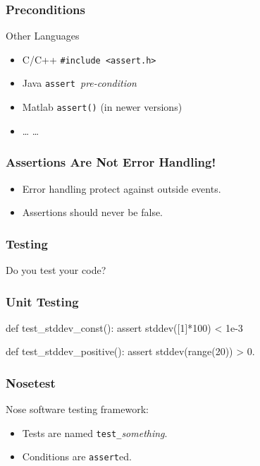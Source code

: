 \begin{frame}[fragile]
\frametitle{Preconditions}
\begin{block}{Other Languages}
\begin{itemize}
\item \alert{C/C++} \lstinline{#include <assert.h>}
\item \alert{Java} \lstinline{assert }\textit{pre-condition}
\item \alert{Matlab} \lstinline{assert()} (in newer versions)
\item \alert{\ldots} \ldots
\end{itemize}
\end{block}
\end{frame}

\begin{frame}[fragile]
\frametitle{Assertions Are Not Error Handling!}

\begin{itemize}
\item Error handling protect against outside events.
\item Assertions \alert{should never} be false.
\end{itemize}
\end{frame}


\begin{frame}[fragile]
\frametitle{Testing}

Do you test your code?

\end{frame}

\begin{frame}[fragile]
\frametitle{Unit Testing}

\begin{python}
def test_stddev_const():
    assert stddev([1]*100) < 1e-3

def test_stddev_positive():
    assert stddev(range(20)) > 0.
\end{python}

\end{frame}

\begin{frame}[fragile]
\frametitle{Nosetest}

Nose software testing framework:
\begin{itemize}
\item Tests are named \lstinline{test_}\textit{something}.
\item Conditions are \lstinline{assert}ed.
\end{itemize}

\end{frame}


